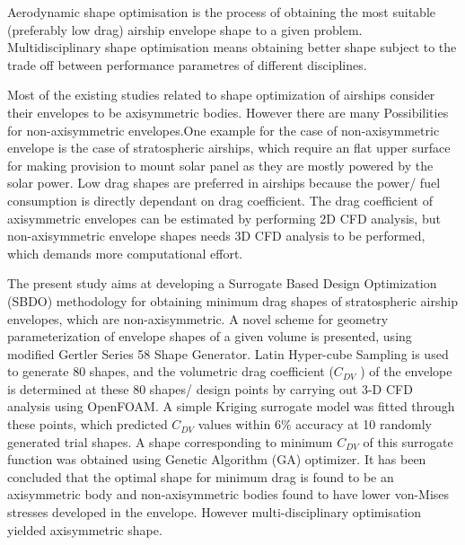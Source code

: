\begin{Abstract}
	
Aerodynamic shape optimisation is the process of obtaining the most suitable (preferably low drag) airship envelope shape to a given problem. Multidisciplinary shape optimisation means obtaining better shape subject to the trade off between performance parametres of different disciplines.

Most of the existing studies related to shape optimization of airships consider their envelopes to be axisymmetric bodies. However there are many Possibilities for non-axisymmetric envelopes.One example for the case of non-axisymmetric envelope is the case of stratospheric airships, which require an flat upper surface for making provision to mount solar panel as they are mostly powered by the solar power. Low drag shapes are preferred in airships because the power/ fuel consumption is directly dependant on drag coefficient.  The drag coefficient of axisymmetric envelopes can be estimated by performing 2D CFD analysis, but non-axisymmetric envelope shapes needs 3D CFD analysis to be performed, which demands more computational effort. 

The present study aims at developing a Surrogate Based Design Optimization (SBDO) methodology for obtaining minimum drag shapes of stratospheric airship envelopes, which are non-axisymmetric. A novel scheme for geometry parameterization of envelope shapes of a given volume is presented, using modified Gertler Series 58 Shape Generator. Latin Hyper-cube Sampling is used to generate 80 shapes, and the volumetric drag coefficient ($ C_{DV} $ ) of the envelope is determined at these 80 shapes/ design points by carrying out 3-D CFD analysis using OpenFOAM\textsuperscript{\textregistered}. A simple Kriging surrogate model was fitted through these points, which predicted  $ C _{DV} $  values within $ 6 \% $ accuracy at 10 randomly generated trial shapes. A shape corresponding to minimum $ C _{DV} $ of this surrogate function was obtained using Genetic Algorithm (GA) optimizer. It has been concluded that the optimal shape for minimum drag is found to be an axisymmetric body and non-axisymmetric bodies found to have lower von-Mises stresses developed in the envelope. However multi-disciplinary optimisation yielded axisymmetric shape.
\end{Abstract}
